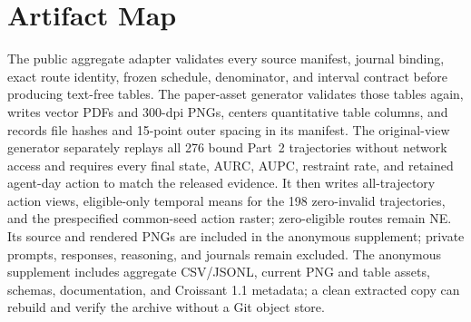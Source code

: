 \documentclass{article}
\begin{document}
\section{Artifact Map}
\label{app:artifact-map}
The public aggregate adapter validates every source manifest, journal binding, exact route identity, frozen schedule, denominator, and interval contract before producing text-free tables.
The paper-asset generator validates those tables again, writes vector PDFs and 300-dpi PNGs, centers quantitative table columns, and records file hashes and 15-point outer spacing in its manifest.
The original-view generator separately replays all 276 bound Part~2 trajectories without network access and requires every final state, AURC, AUPC, restraint rate, and retained agent-day action to match the released evidence. It then writes all-trajectory action views, eligible-only temporal means for the 198 zero-invalid trajectories, and the prespecified common-seed action raster; zero-eligible routes remain NE.
Its source and rendered PNGs are included in the anonymous supplement; private prompts, responses, reasoning, and journals remain excluded.
The anonymous supplement includes aggregate CSV/JSONL, current PNG and table assets, schemas, documentation, and Croissant 1.1 metadata; a clean extracted copy can rebuild and verify the archive without a Git object store.


\end{document}

